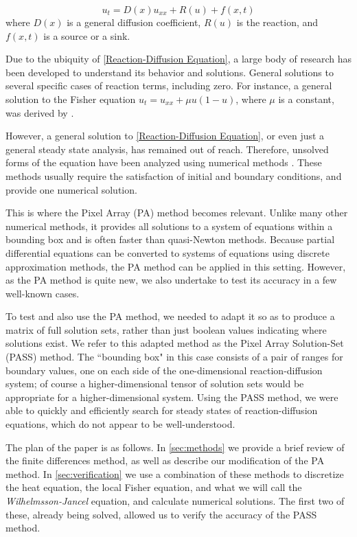 \documentclass[11pt]{article}
\begin{document}
\begin{equation}
    \label{Reaction-Diffusion Equation}
    u_t = D(x)u_{xx} + R(u) + f(x,t)
\end{equation}
where $D(x)$ is a general diffusion coefficient, $R(u)$ is the reaction, and $f(x,t)$ is a source or a sink.

Due to the ubiquity of \cref{Reaction-Diffusion Equation}, a large body of research has been developed to understand its behavior and solutions. General solutions to several specific cases of reaction terms, including zero. For instance, a general solution to the Fisher equation $u_t = u_{xx} + \mu u(1-u)$, where $\mu$ is a constant, was derived by \citep{AnalyticFisher}.

However, a general solution to \cref{Reaction-Diffusion Equation}, or even just a general steady state analysis, has remained out of reach. Therefore, unsolved forms of the equation have been analyzed using numerical methods \citep{Numerical_RD_1, Numerical_RD_2, Numerical_RD_3}. These methods usually require the satisfaction of initial and boundary conditions, and provide one numerical solution.

This is where the Pixel Array (PA) method \citep{Introduction_to_PA} becomes relevant. Unlike many other numerical methods, it provides all solutions to a system of equations within a bounding box and is often faster than quasi-Newton methods. Because partial differential equations can be converted to systems of equations using discrete approximation methods, the PA method can be applied in this setting. However, as the PA method is quite new, we also undertake to test its accuracy in a few well-known cases.

To test and also use the PA method, we needed to adapt it so as to produce a matrix of full solution sets, rather than just boolean values indicating where solutions exist. We refer to this adapted method as the Pixel Array Solution-Set (PASS) method. The ``bounding box" in this case consists of a pair of ranges for boundary values, one on each side of the one-dimensional reaction-diffusion system; of course a higher-dimensional tensor of solution sets would be appropriate for a higher-dimensional system. Using the PASS method, we were able to quickly and efficiently search for steady states of reaction-diffusion equations, which do not appear to be well-understood.

The plan of the paper is as follows. In \cref{sec:methods} we provide a brief review of the finite differences method, as well as describe our modification of the PA method. In \cref{sec:verification} we use a combination of these methods to discretize the heat equation, the local Fisher equation, and what we will call the \textit{Wilhelmsson-Jancel} equation, and calculate numerical solutions. The first two of these, already being solved, allowed us to verify the accuracy of the PASS method.
\end{document}
